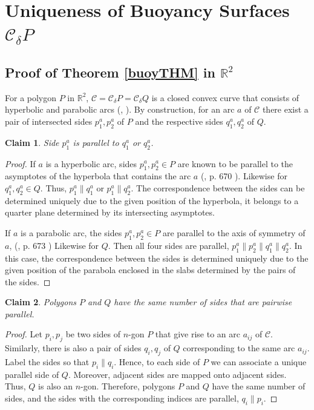 \documentclass[12pt,letterpaper,reqno]{amsart}
\newtheorem{claim}{Claim}
\begin{document}
\section{Uniqueness of Buoyancy Surfaces $\mathcal{C}_\delta P$}

\subsection{Proof of Theorem \ref{buoyTHM} in $\mathbb{R}^2$}

For a polygon $P$ in $\mathbb{R}^2$, $\mathcal{C}=\mathcal{C}_\delta P=\mathcal{C}_\delta Q$ is a closed convex curve that consists of hyperbolic and parabolic arcs (\cite{Z}, \cite{VP}). By construction, for an arc $a$ of $\mathcal{C}$ there exist a pair of intersected sides $p_1^a, p_2^a$ of $P$ and the respective sides $q_1^a, q_2^a$ of $Q$.

\begin{claim}
Side $p_1^a$ is parallel to $q_1^a$ or $q_2^a$.
\end{claim}

\begin{proof}
    If $a$ is a hyperbolic arc, sides $p_1^a, p_2^a\in P$ are known to be parallel to the asymptotes of the hyperbola that contains the arc $a$ (\cite{Z}, p. 670 ). Likewise for $q_1^a,q_2^a\in Q$. Thus, $p_1^a\parallel q_1^a$ or $p_1^a\parallel q_2^a$. The correspondence between the sides can be determined uniquely due to the given position of the hyperbola, it belongs to a quarter plane determined by its intersecting asymptotes.

    If $a$ is a parabolic arc, the sides $p_1^a, p_2^a\in P$ are parallel to the axis of symmetry of $a$, (\cite{Z}, p. 673 ) Likewise for $Q$. Then all four sides are parallel, $p_1^a\parallel p_2^a\parallel q_1^a\parallel q_2^a$. In this case, the correspondence between the sides is determined uniquely due to the given position of the parabola enclosed in the slabs determined by the pairs of the sides.
\end{proof}

\begin{claim} \label{parallel-sides}
Polygons $P$ and $Q$ have the same number of sides that are pairwise parallel.
\end{claim}

\begin{proof}
    Let $p_i, p_j$ be two sides of $n$-gon $P$ that give rise to an arc $a_{ij}$ of $\mathcal{C}$. Similarly, there is also a pair of sides $q_i,q_j$ of $Q$ corresponding to the same arc $a_{ij}$.
    Label the sides so that $p_i\parallel q_i$. Hence, to each side of $P$ we can associate a unique parallel side of $Q$. Moreover, adjacent sides are mapped onto adjacent sides. 
    Thus, $Q$ is also an $n$-gon. Therefore, polygons $P$ and $Q$ have the same number of sides, and  the sides with the corresponding indices are parallel, $q_i\parallel p_i$.
\end{proof}
\end{document}
